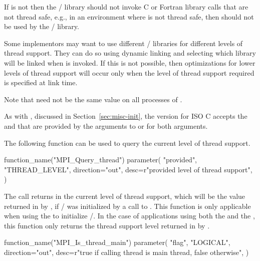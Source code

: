 \begin{implementors}
If  is not  then the \MPI/
library should not
invoke C or Fortran library calls that are
not thread safe, e.g., in an environment where  is not thread
safe, then  should not be used by the \MPI/ library.

Some implementors may want to use different \MPI/ libraries for
different levels of thread support.   They can do so using dynamic
linking and selecting which library will be linked when
 is invoked.
If this is not possible, then optimizations for lower levels
of thread support will occur only when the level of thread support required
is specified at link time.

Note that  need not be the same value on all
processes of .
\end{implementors}

As with , discussed in Section~\ref{sec:misc-init}, the version for ISO C accepts
the  and  that are provided by the arguments to  or 
for both arguments.

The following function can be used to query the current level of thread
support.

\begin{mpi-binding}
    function_name("MPI_Query_thread")
    parameter(
        "provided",
        "THREAD_LEVEL",
        direction="out",
        desc=r"provided level of thread support",
    )
\end{mpi-binding}

The call returns in  the current level of thread
support, which will be the value returned in  by
, if \MPI/
was initialized by a call to .
This function is only applicable when using the \wpm{} to
initialize \MPI/.  In the case of applications using both the \wpm{}
and the \spm{}, this function only returns the
thread support level returned in  by .

%
\begin{mpi-binding}
    function_name("MPI_Is_thread_main")
    parameter(
        "flag",
        "LOGICAL",
        direction="out",
        desc=r"true if calling thread is main thread, false otherwise",
    )
\end{mpi-binding}

